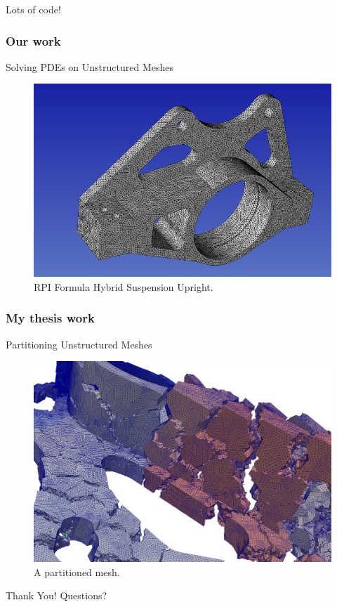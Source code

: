 \documentclass{beamer}
\begin{document}
\begin{frame}
  \center Lots of code!
\end{frame}

\begin{frame}
  \frametitle{Our work}
  \center Solving PDEs on Unstructured Meshes
   \begin{figure} \centering 
     \includegraphics[width=.8\textwidth]{figs/mesh/upright.png}
     \caption{RPI Formula Hybrid Suspension Upright.}
  \end{figure}
\end{frame}

\begin{frame}
  \frametitle{My thesis work}
  \center Partitioning Unstructured Meshes
   \begin{figure} \centering 
     \includegraphics[width=.8\textwidth]{figs/mesh/upright512explodedWithEdgesZoom.png}
     \caption{A partitioned mesh.}
  \end{figure}
\end{frame}

\begin{frame}
  \center Thank You!
  \center Questions?
\end{frame}
\end{document}
